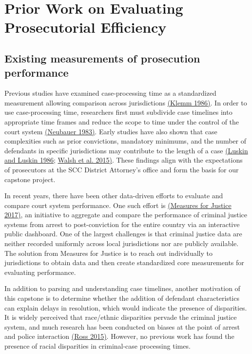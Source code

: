 \section{Prior Work on Evaluating Prosecutorial Efficiency }

 \subsection{Existing measurements of prosecution performance} 

Previous studies have examined case-processing time as a standardized
measurement allowing comparison across jurisdictions
\hyperref[csl:6]{(Klemm 1986)}. In order to use case-processing time,
researchers first must subdivide case timelines into appropriate time
frames and reduce the scope to time under the control of the court
system \hyperref[csl:7]{(Neubauer 1983)}. Early studies have also
shown that case complexities such as prior convictions, mandatory
minimums, and the number of defendants in specific jurisdictions may
contribute to the length of a case \hyperref[csl:8]{(Luskin and Luskin
  1986}; \hyperref[csl:9]{Walsh et al. 2015)}. These findings align
with the expectations of prosecutors at the SCC District Attorney's
office and form the basis for our capstone project.

In recent years, there have been other data-driven efforts to evaluate
and compare court system performance. One such effort is
\hyperref[csl:5]{({Measures for Justice} 2017)}, an initiative to
aggregate and compare the performance of criminal justice systems from
arrest to post-conviction for the entire country via an interactive
public dashboard. One of the largest challenges is that criminal
justice data are neither recorded uniformly across local jurisdictions
nor are publicly available. The solution from Measures for Justice is
to reach out individually to jurisdictions to obtain data and then
create standardized core measurements for evaluating performance.

In addition to parsing and understanding case timelines, another
motivation of this capstone is to determine whether the addition of
defendant characteristics can explain delays in resolution, which
would indicate the presence of disparities. It is widely perceived
that race/ethnic disparities pervade the criminal justice system, and
much research has been conducted on biases at the point of arrest and
police interaction \hyperref[csl:10]{(Ross 2015)}. However, no
previous work has found the presence of racial disparities in
criminal-case processing times.

